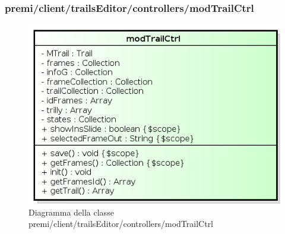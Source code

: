 \subsubsection{premi/client/trailsEditor/controllers/modTrailCtrl}
\begin{figure}[H]
\begin{center}
\includegraphics[scale=0.85]{img/diacla/modTrailCtrl.png}
\caption{Diagramma della classe premi/client/trailsEditor/controllers/modTrailCtrl}
\end{center}
\end{figure}


